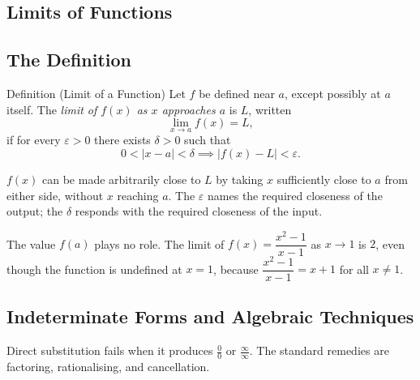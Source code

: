 
\subsection{Limits of Functions}


\subsection*{The Definition}

\begin{propositionbox}{Definition (Limit of a Function)}
Let $f$ be defined near $a$, except possibly at $a$ itself.
The \emph{limit of $f(x)$ as $x$ approaches $a$} is $L$, written
\[
  \lim_{x \to a} f(x) = L,
\]
if for every $\varepsilon > 0$ there exists $\delta > 0$ such that
\[
  0 < |x - a| < \delta \implies |f(x) - L| < \varepsilon.
\]
\end{propositionbox}

\begin{remark*}[Intuition]
$f(x)$ can be made arbitrarily close to $L$ by taking $x$
sufficiently close to $a$ from either side, without $x$ reaching $a$.
The $\varepsilon$ names the required closeness of the output;
the $\delta$ responds with the required closeness of the input.
\end{remark*}

\begin{remark*}
The value $f(a)$ plays no role. The limit of $f(x) = \dfrac{x^2 - 1}{x - 1}$
as $x \to 1$ is $2$, even though the function is undefined at $x = 1$,
because $\dfrac{x^2-1}{x-1} = x + 1$ for all $x \neq 1$.
\end{remark*}


\subsection*{Indeterminate Forms and Algebraic Techniques}

\begin{remark*}
Direct substitution fails when it produces $\tfrac{0}{0}$ or
$\tfrac{\infty}{\infty}$. The standard remedies are factoring,
rationalising, and cancellation.
\end{remark*}

